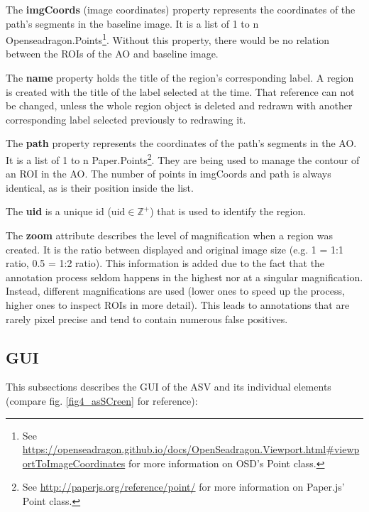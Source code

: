 The \textbf{imgCoords} (image coordinates) property represents the coordinates of the path's segments in the baseline image. It is a list of 1 to n Openseadragon.Points\footnote{
	See \url{https://openseadragon.github.io/docs/OpenSeadragon.Viewport.html\#viewportToImageCoordinates} for more information on OSD's Point class.
}.
Without this property, there would be no relation between the ROIs of the AO and baseline image.

The \textbf{name} property holds the title of the region's corresponding label. A region is created with the title of the label selected at the time. That reference can not be changed, unless the whole region object is deleted and redrawn with another corresponding label selected previously to redrawing it.

The \textbf{path} property represents the coordinates of the path's segments in the AO. It is a list of 1 to n Paper.Points\footnote{
	See \url{http://paperjs.org/reference/point/} for more information on Paper.js' Point class.
}. They are being used to manage the contour of an ROI in the AO. The number of points in imgCoords and path is always identical, as is their position inside the list.

The \textbf{uid} is a unique id ($\text{uid} \in \mathbb{Z}^{+}$) that is used to identify the region.

The \textbf{zoom} attribute describes the level of magnification when a region was created. It is the ratio between displayed and original image size (e.g. 1 = 1:1 ratio, 0.5 = 1:2 ratio). This information is added due to the fact that the annotation process seldom happens in the highest nor at a singular magnification. Instead, different magnifications are used (lower ones to speed up the process, higher ones to inspect ROIs in more detail). This leads to annotations that are rarely pixel precise and tend to contain numerous false positives\cite{Janowczyk16}.


\subsection{GUI}
This subsections describes the GUI of the ASV and its individual elements (compare fig. \ref{fig4_asSCreen} for reference):

